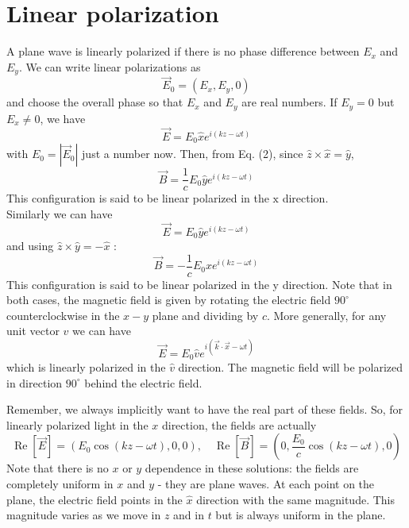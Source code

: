  \section{Linear polarization}
  A plane wave is linearly polarized if there is no phase difference between $E_{x}$ and $E_{y}$. We can write linear polarizations as
 $$
 \vec{E}_{0}=\left(E_{x}, E_{y}, 0\right)
 $$
 and choose the overall phase so that $E_{x}$ and $E_{y}$ are real numbers. If $E_{y}=0$ but $E_{x} \neq 0$, we have
 $$
 \vec{E}=E_{0} \hat{x} e^{i(k z-\omega t)}
 $$
 with $E_{0}=\left|\vec{E}_{0}\right|$ just a number now. Then, from Eq. (2), since $\hat{z} \times \hat{x}=\hat{y}$,
 $$
 \vec{B}=\frac{1}{c} E_{0} \hat{y} e^{i(k z-\omega t)}
 $$
 This configuration is said to be linear polarized in the $\mathrm{x}$ direction.\\
 Similarly we can have
 $$
 \vec{E}=E_{0} \hat{y} e^{i(k z-\omega t)}
 $$
 and using $\hat{z} \times \hat{y}=-\hat{x}$ :
 $$
 \vec{B}=-\frac{1}{c} E_{0} \hat{x} e^{i(k z-\omega t)}
 $$
 This configuration is said to be linear polarized in the y direction. Note that in both cases, the magnetic field is given by rotating the electric field $90^{\circ}$ counterclockwise in the $x-y$ plane and dividing by $c$.
 More generally, for any unit vector $\hat{v}$ we can have
 $$
 \vec{E}=E_{0} \hat{v} e^{i(\vec{k} \cdot \vec{x}-\omega t)}
 $$
 which is linearly polarized in the $\hat{v}$ direction. The magnetic field will be polarized in direction $90^{\circ}$ behind the electric field.
 
 Remember, we always implicitly want to have the real part of these fields. So, for linearly polarized light in the $x$ direction, the fields are actually
 $$
 \operatorname{Re}[\vec{E}]=\left(E_{0} \cos (k z-\omega t), 0,0\right), \quad \operatorname{Re}[\vec{B}]=\left(0, \frac{E_{0}}{c} \cos (k z-\omega t), 0\right)
 $$
 Note that there is no $x$ or $y$ dependence in these solutions: the fields are completely uniform in $x$ and $y$ - they are plane waves. At each point on the plane, the electric field points in the $\hat{x}$ direction with the same magnitude. This magnitude varies as we move in $z$ and in $t$ but is always uniform in the plane.
